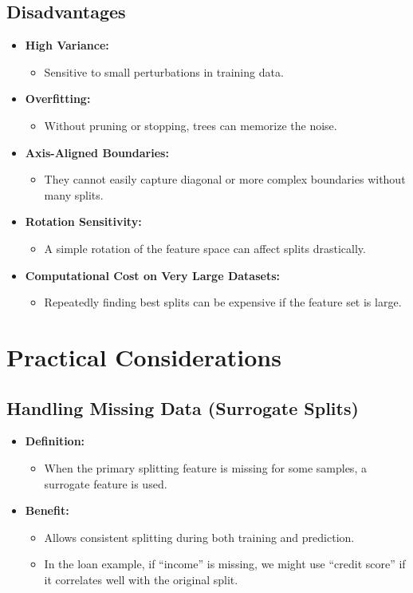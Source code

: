 \documentclass[10pt]{article}
\begin{document}
\subsection{Disadvantages}
\begin{itemize}
    \item \textbf{High Variance:}
    \begin{itemize}
        \item Sensitive to small perturbations in training data.
    \end{itemize}
    \item \textbf{Overfitting:}
    \begin{itemize}
        \item Without pruning or stopping, trees can memorize the noise.
    \end{itemize}
    \item \textbf{Axis-Aligned Boundaries:}
    \begin{itemize}
        \item They cannot easily capture diagonal or more complex boundaries without many splits.
    \end{itemize}
    \item \textbf{Rotation Sensitivity:}
    \begin{itemize}
        \item A simple rotation of the feature space can affect splits drastically.
    \end{itemize}
    \item \textbf{Computational Cost on Very Large Datasets:}
    \begin{itemize}
        \item Repeatedly finding best splits can be expensive if the feature set is large.
    \end{itemize}
\end{itemize}

\section{Practical Considerations}

\subsection{Handling Missing Data (Surrogate Splits)}
\begin{itemize}
    \item \textbf{Definition:}
    \begin{itemize}
        \item When the primary splitting feature is missing for some samples, a surrogate feature is used.
    \end{itemize}
    \item \textbf{Benefit:}
    \begin{itemize}
        \item Allows consistent splitting during both training and prediction.
        \item In the loan example, if ``income'' is missing, we might use ``credit score'' if it correlates well with the original split.
    \end{itemize}
\end{itemize}
\end{document}

